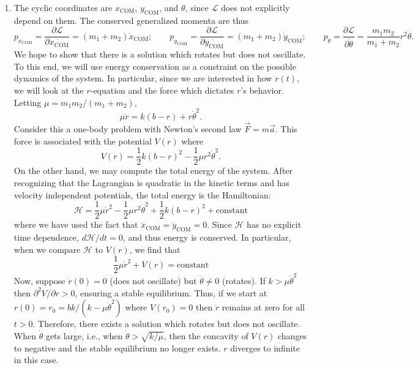 \documentclass{article}
\theoremstyle{definition}
\newcommand{\p}{\partial}
\newcommand{\lag}{\mathcal{L}}
\newcommand{\ham}{\mathcal{H}}
\newcommand{\f}[2]{\frac{#1}{#2}}
\begin{document}
\begin{enumerate}[label = (\alph*)]
	
	\item The cyclic coordinates are $x_\text{COM}$, $y_\text{COM}$, and $\theta$, since $\lag$ does not explicitly depend on them. The conserved generalized momenta are thus
	\begin{equation*}
	p_{x_\text{COM}} = \f{\p \lag}{\p \dot{x_\text{COM}}} = (m_1+m_2)\dot{x}_\text{COM}; \quad\quad p_{y_\text{COM}} = \f{\p \lag}{\p \dot{y_\text{COM}}} = (m_1+m_2)\dot{y}_\text{COM}; \quad\quad
	p_\theta = \f{\p \lag}{\p \dot{\theta}} = \f{m_1m_2}{m_1+m_2} r^2\dot{\theta}.
	\end{equation*}
 	We hope to show that there is a solution which rotates but does not oscillate. To this end, we will use energy conservation as a constraint on the possible dynamics of the system. In particular, since we are interested in how $r(t)$, we will look at the $r$-equation and the force which dictates $r$'s behavior. Letting $\mu = m_1m_2/(m_1+m_2)$,
 	\begin{equation*}
 	\mu \ddot{r} = k(b-r) + r\dot{\theta}^2.
 	\end{equation*}
 	Consider this a one-body problem with Newton's second law $\vec{F} = m\vec{a}$. This force is associated with the potential $V(r)$ where
 	\begin{equation*}
 	V(r) = \f{1}{2}k(b-r)^2 - \f{1}{2}\mu r^2\dot{\theta}^2.
 	\end{equation*}
	On the other hand, we may compute the total energy of the system. After recognizing that the Lagrangian is quadratic in the kinetic terms and has velocity independent potentials, the total energy is the Hamiltonian:
	\begin{equation*}
	\ham = \f{1}{2}\mu \dot{r}^2 - \f{1}{2}\mu r^2\dot{\theta}^2 + \f{1}{2}k(b-r)^2 + \text{constant}
	\end{equation*}
	where we have used the fact that $\ddot{x}_\text{COM} = \ddot{y}_\text{COM} = 0$. Since $\ham$ has no explicit time dependence, $d\ham / dt = 0$, and thus energy is conserved. In particular, when we compare $\ham$ to $V(r)$, we find that
	\begin{equation*}
	\f{1}{2}\mu \dot{r}^2 + V(r) = \text{constant}
	\end{equation*}
	Now, suppose $\dot{r}(0) = 0$ (does not oscillate) but $\dot{\theta} \neq 0$ (rotates). If $k > \mu \dot{\theta}^2$ then $\p^2 V/\p r > 0$, ensuring a stable equilibrium. Thus, if we start at $r(0) = r_0 = bk / (k - \mu \dot{\theta}^2)$ where $V(r_0) = 0$ then $\dot{r}$ remains at zero for all $t > 0$. Therefore, there exists a solution which rotates but does not oscillate. When $\dot{\theta}$ gets large, i.e., when $\dot{\theta} > \sqrt{k/\mu}$, then the concavity of $V(r)$ changes to negative and the stable equilibrium no longer exists. $r$ diverges to infinite in this case.
	

\end{enumerate}
\end{document}
